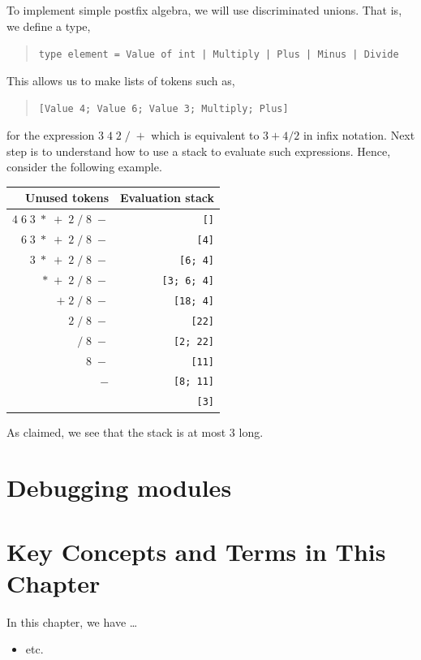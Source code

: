 \documentclass[fsharpNotes.tex]{subfiles}
\begin{document}
To implement simple postfix algebra, we will use discriminated unions. That is, we define a type,
\begin{quote}
\lstinline{type element = Value of int | Multiply | Plus | Minus | Divide}
\end{quote}
This allows us to make lists of tokens such as,
\begin{quote}
\lstinline{[Value 4; Value 6; Value 3; Multiply; Plus]}
\end{quote}
for the expression $3\; 4\; 2\; /\; +$ which is equivalent to $3+4/2$ in infix notation. Next step is to understand how to use a stack to evaluate such expressions. Hence, consider the following example.
\begin{center}
  \begin{tabular}{r|r}
  Unused tokens &  Evaluation stack\\\hline
  $4\; 6\; 3\; *\; +\; 2\; /\; 8\; -$ & \lstinline![]! \\
  $6\; 3\; *\; +\; 2\; /\; 8\; -$ & \lstinline![4]! \\
  $3\; *\; +\; 2\; /\; 8\; -$ & \lstinline![6; 4]! \\
  $*\; +\; 2\; /\; 8\; -$ & \lstinline![3; 6; 4]! \\
  $+\; 2\; /\; 8\; -$ & \lstinline![18; 4]! \\
  $2\; /\; 8\; -$ & \lstinline![22]! \\
  $/\; 8\; -$ & \lstinline![2; 22]! \\
  $8\; -$ & \lstinline![11]! \\
  $-$ & \lstinline![8; 11]! \\
   & \lstinline![3]! \\
\end{tabular}
\end{center}
As claimed, we see that the stack is at most 3 long.



\section{Debugging modules}


\section{Key Concepts and Terms in This Chapter}
In this chapter, we have \dots
\begin{itemize}
\item etc.
\end{itemize}
\end{document}
